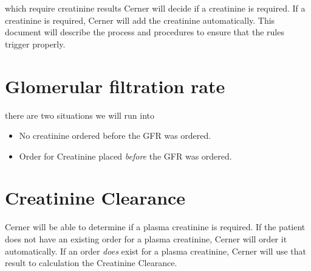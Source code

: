  which require creatinine results Cerner will decide if a creatinine is required. If a creatinine is required, Cerner will add the creatinine automatically. This document will describe the process and procedures to ensure that the rules trigger properly.

\bigskip

\section{Glomerular filtration rate}

 there are two situations we will run into
\begin{itemize}
\item No creatinine ordered before the GFR was ordered.
\item Order for Creatinine placed \textit{before} the GFR was ordered.
\end{itemize}


\section{Creatinine Clearance}

 Cerner will be able to determine if a plasma creatinine is required. If the patient does not have an existing order for a plasma creatinine, Cerner will order it automatically. If an order \textit{does} exist for a plasma creatinine, Cerner will use that result to calculation the Creatinine Clearance.



